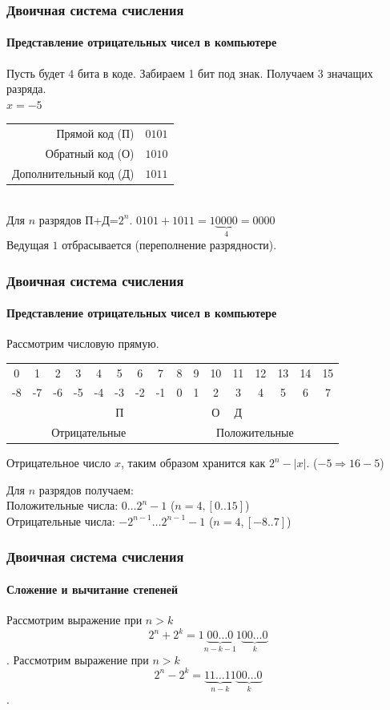 \begin{frame}
  \frametitle{Двоичная система счисления}
	\framesubtitle{Представление отрицательных чисел в компьютере}
	Пусть будет $4$ бита в коде. Забираем 1 бит под знак. Получаем $3$ значащих разряда.\\
	$x=-5$\\ \pause

	\begin{tabular}{rl}
 Прямой код (П) & $0101$\tabularnewline
Обратный код (О) & $1010$\tabularnewline
Дополнительный код (Д)  & $1011$ \tabularnewline 
\end{tabular}\\  

\pause
	Для $n$ разрядов П+Д=$2^n$. $0101+1011=1\underbrace{0000}_{4}=0000$\\
	Ведущая $1$ отбрасывается (переполнение разрядности).\\  	 
	
\end{frame}

\begin{frame}
  \frametitle{Двоичная система счисления}
	\framesubtitle{Представление отрицательных чисел в компьютере}
	Рассмотрим числовую прямую. 
	\small
	\begin{tabular}{cccccccc|cccccccc}
0 & 1 & 2 & 3 & 4 & \textcolor[rgb]{1,0,0}{5} & 6 & 7 & 8 & 9 & \textcolor[rgb]{1,0,0}{10} & \textcolor[rgb]{1,0,0}{11} & 12 & 13 & 14 & 15\tabularnewline
-8 & -7 & -6 & -5 & -4 & -3 & -2 & -1 & 0 & 1 & 2 & 3 & 4 & 5 & 6 & 7\tabularnewline
 &  &  &  &  & \textcolor[rgb]{1,0,0}{П} &  &  &  &  & \textcolor[rgb]{1,0,0}{О} & \textcolor[rgb]{1,0,0}{Д} &  &  &  & \tabularnewline
\multicolumn{8}{c|}{Отрицательные} & \multicolumn{8}{c}{Положительные}\tabularnewline
\end{tabular}
	 \normalsize
	Отрицательное число $x$, таким образом хранится как $2^n-|x|$. ($-5\Rightarrow 16-5$)
	
	Для $n$ разрядов получаем:\\
	Положительные числа: $0\ldots 2^n-1$ ($n=4, [0..15]$)\\
	Отрицательные числа: $-2^{n-1}\ldots 2^{n-1}-1$ ($n=4, [-8..7]$)
	
\end{frame}

\begin{frame}
  \frametitle{Двоичная система счисления}
	\framesubtitle{Сложение и вычитание степеней}
	\pause
	Рассмотрим выражение при $n>k$ $$2^n+2^k=1\underbrace{00\ldots 0}_{n-k-1}1\underbrace{00\ldots0}_{k} $$.
	\pause
	Рассмотрим выражение при $n>k$ $$2^n-2^k=\underbrace{11\ldots 11}_{n-k}\underbrace{00\ldots0}_{k} $$.
	
	
\end{frame}

